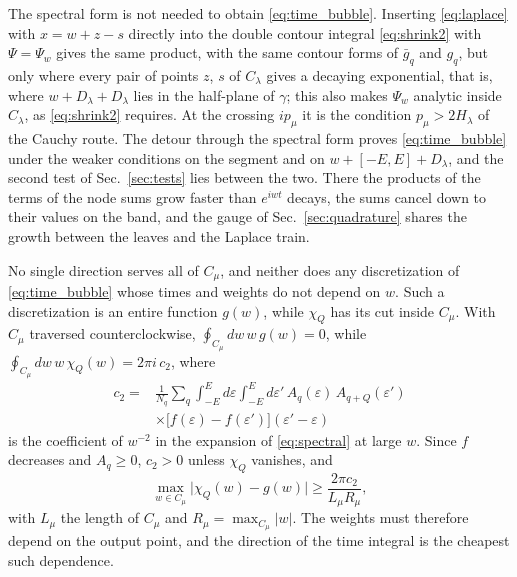 \documentclass[aps,prb,reprint,a4paper]{revtex4-2}
\begin{document}
The spectral form is not needed to obtain \eqref{eq:time_bubble}. Inserting \eqref{eq:laplace} with $x=w+z-s$ directly into the double contour integral \eqref{eq:shrink2} with $\Psi=\Psi_w$ gives the same product, with the same contour forms of $\bar g_q$ and $g_q$, but only where every pair of points $z$, $s$ of $C_\lambda$ gives a decaying exponential, that is, where $w+D_\lambda+D_\lambda$ lies in the half-plane of $\gamma$; this also makes $\Psi_w$ analytic inside $C_\lambda$, as \eqref{eq:shrink2} requires. At the crossing $ip_\mu$ it is the condition $p_\mu>2H_\lambda$ of the Cauchy route. The detour through the spectral form proves \eqref{eq:time_bubble} under the weaker conditions on the segment and on $w+[-E,E]+D_\lambda$, and the second test of Sec.~\ref{sec:tests} lies between the two. There the products of the terms of the node sums grow faster than $e^{iwt}$ decays, the sums cancel down to their values on the band, and the gauge of Sec.~\ref{sec:quadrature} shares the growth between the leaves and the Laplace train.

No single direction serves all of $C_\mu$, and neither does any discretization of \eqref{eq:time_bubble} whose times and weights do not depend on $w$. Such a discretization is an entire function $g(w)$, while $\chi_Q$ has its cut inside $C_\mu$. With $C_\mu$ traversed counterclockwise, $\oint_{C_\mu}dw\,w\,g(w)=0$, while $\oint_{C_\mu}dw\,w\,\chi_Q(w)=2\pi i\,c_2$, where
\begin{equation}
  \begin{aligned}
  c_2={}&\frac1{N_q}\sum_q\int_{-E}^{E}d\varepsilon\int_{-E}^{E}d\varepsilon'\,A_q(\varepsilon)\,A_{q+Q}(\varepsilon')\\
  &\times\big[f(\varepsilon)-f(\varepsilon')\big](\varepsilon'-\varepsilon)
  \end{aligned}
  \label{eq:c2}
\end{equation}
is the coefficient of $w^{-2}$ in the expansion of \eqref{eq:spectral} at large $w$. Since $f$ decreases and $A_q\ge0$, $c_2>0$ unless $\chi_Q$ vanishes, and
\begin{equation}
  \max_{w\in C_\mu}\lvert\chi_Q(w)-g(w)\rvert\ge\frac{2\pi c_2}{L_\mu R_\mu},
  \label{eq:entire_bound}
\end{equation}
with $L_\mu$ the length of $C_\mu$ and $R_\mu=\max_{C_\mu}\lvert w\rvert$. The weights must therefore depend on the output point, and the direction of the time integral is the cheapest such dependence.
\end{document}
